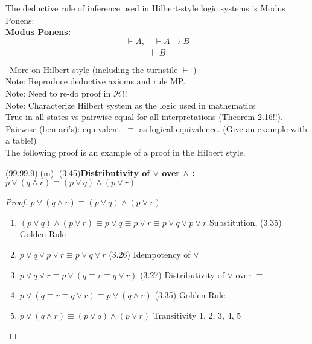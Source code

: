 \documentclass[fleqn, leqno]{article}
\newcommand{\lgap}{2pt}                             %
\begin{document}
The deductive rule of inference used in Hilbert-style logic systems is Modus Ponens:\\

\textbf{Modus Ponens:}
\[
\frac{\vdash A, \quad \vdash A \rightarrow B}{\vdash B}
\]

--More on Hilbert style (including the turnstile $\vdash$ )\\

Note: Reproduce deductive axioms and rule MP.\\

Note: Need to re-do proof in $\mathcal{H}$!!\\

Note: Characterize Hilbert system as the logic used in mathematics\\

True in all states vs pairwise equal for all interpretations (Theorem 2.16!!).  Pairwise (ben-ari's): equivalent.  $\equiv$ as logical equivalence.  (Give an example with a table!)\\

The following proof is an example of a proof in the Hilbert style.\\

\begin{tabbing}
(99.99.9)$\;$\=(m)$\;$\=\kill
(3.45)\>\textbf{Distributivity of $\lor$ over $\land$ :}\quad $p\lor (q\land r)\equiv (p\lor q)\land (p\lor r)$\\[\lgap]
\end{tabbing}

\begin{proof}
$p\lor (q\land r)\equiv (p\lor q)\land (p\lor r)$
\begin{enumerate}
 \item $(p\lor q)\land (p\lor r)\equiv p\lor q\equiv p\lor r\equiv p\lor q\lor p\lor r$ \hfill Substitution, (3.35) Golden Rule
 \item $p\lor q\lor p\lor r\equiv p\lor q\lor r$ \hfill (3.26) Idempotency of $\lor$
 \item $p\lor q\lor r\equiv p\lor (q\equiv r\equiv q\lor r)$ \hfill (3.27) Distributivity of $\lor$ over $\equiv$
 \item $p\lor (q\equiv r\equiv q\lor r)\equiv p\lor (q\land r)$ \hfill (3.35) Golden Rule
 \item $p\lor (q\land r)\equiv (p\lor q)\land (p\lor r)$ \hfill Transitivity 1, 2, 3, 4, 5
\end{enumerate}
\end{proof}
\end{document}

